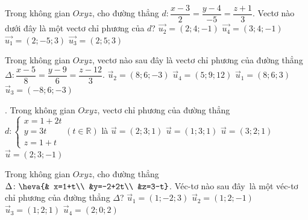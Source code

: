 \begin{ex}%
	Trong không gian $Oxyz$, cho đường thẳng $d\colon \dfrac{x-3}{2}=\dfrac{y-4}{-5}=\dfrac{z+1}{3}$. Vectơ nào dưới đây là một vectơ  chỉ phương của $d$?
	\choice 
		{$\overrightarrow{u_2}=(2;4;-1)$} 
		 {$\overrightarrow{u_4}=(3;4;-1)$}
		{\True$\overrightarrow{u_1}=(2;-5;3)$} 
		 {$\overrightarrow{u_3}=(2;5;3)$}
\end{ex}

\begin{ex}%
	Trong không  gian $Oxyz$, vectơ nào sau đây là vectơ chỉ phương của đường thẳng $\Delta \colon \dfrac{x-5}{8}=\dfrac{y-9}{6}=\dfrac{z-12}{3}$.
	\choice 
		{$\overrightarrow{u}_2=(8;  6;-3)$}
		{$\overrightarrow{u}_4=(5;  9; 12)$}
		{\True $\overrightarrow{u}_1=(8; 6;  3)$}
		{$\overrightarrow{u}_3=(-8;  6;-3)$}
\end{ex}

\begin{ex}%
	. 
	Trong không gian $Oxyz$, vectơ chỉ phương của đường thẳng $d : \begin{cases} x=1+2t \\ y = 3t \\ z=1+t
\end{cases} (t\in\mathbb{R})$ là
\choice 
	{\True $\overrightarrow{u} =  (2;3;1)$}
	{$\overrightarrow{u} = (1;3;1)$} 
	{$\overrightarrow{u} = (3;2;1)$} 
	{$\overrightarrow{u} = (2;3;  -1)$}
\end{ex}

\begin{ex}%
	Trong không gian $Oxyz$, cho đường thẳng $\Delta\colon\heva{& x=1+t\\ &y=-2+2t\\  &z=3-t}$.
	 Véc-tơ nào sau đây~là một véc-tơ chỉ phương của đường thẳng $\Delta$?
	 \choice
		{$\overrightarrow{u}_1=(1;-2;3)$} 
		{\True $\overrightarrow{u}_2=(1;2;-1)$} 
		{$\overrightarrow{u}_3=(1;2;1)$} 
		 {$\overrightarrow{u}_4=(2;0;2)$}
\end{ex}

